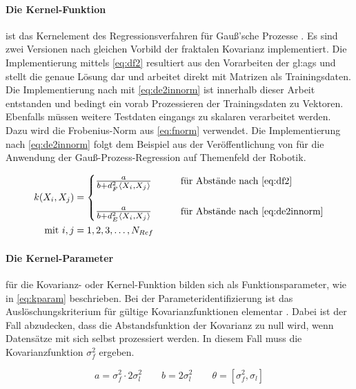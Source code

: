 \paragraph*{Die Kernel-Funktion} ist das Kernelement des Regressionsverfahren für Gauß'sche Prozesse \cite{Rasmussen2006}. Es sind zwei Versionen nach gleichen Vorbild der fraktalen Kovarianz \cite{Schuethe2020b}\cite{Schuethe2020}  implementiert. Die Implementierung mittels \autoref{eq:df2} resultiert aus den Vorarbeiten der \gls{gl:ags} und stellt die genaue Lösung dar und arbeitet direkt mit Matrizen als Trainingsdaten. Die Implementierung nach mit \autoref{eq:de2innorm} ist innerhalb dieser Arbeit entstanden und bedingt ein vorab Prozessieren der Trainingsdaten zu Vektoren. Ebenfalls müssen weitere Testdaten eingangs zu skalaren verarbeitet werden. Dazu wird die Frobenius-Norm aus \autoref{eq:fnorm} verwendet. Die Implementierung nach \autoref{eq:de2innorm} folgt dem Beispiel aus der Veröffentlichung von \citeauthor{Lang2014}\cite{Lang2014} für die Anwendung der Gauß-Prozess-Regression auf Themenfeld der Robotik.


\begin{align}\label{eq:kfun}
	k(X_i, X_j) &= 
		\begin{cases}
			\resizebox{.17\linewidth}{!}{$\frac{a}{b + d_F^2\langle X_i, X_j \rangle}$} &\qquad \text{für Abstände nach \autoref{eq:df2}} \\\\
			\resizebox{.17\linewidth}{!}{$\frac{a}{b + d_E^2\langle X_i, X_j \rangle}$} &\qquad \text{für Abstände nach \autoref{eq:de2innorm}}
		\end{cases} \\
\text{mit } i,j &= 1,2,3,\ldots,N_{Ref} \nonumber
\end{align}


\clearpage


\paragraph*{Die Kernel-Parameter} für die Kovarianz- oder Kernel-Funktion bilden sich als Funktionsparameter, wie in \autoref{eq:kparam} beschrieben. Bei der Parameteridentifizierung ist das Auslöschungskriterium für gültige Kovarianzfunktionen elementar \cite{Rasmussen2006}. Dabei ist der Fall abzudecken, dass die Abstandsfunktion der Kovarianz zu null wird, wenn Datensätze mit sich selbst prozessiert werden. In diesem Fall muss die Kovarianzfunktion $\sigma_f^2$ ergeben.


\begin{equation}\label{eq:kparam}
	a = \sigma_f^2 \cdot 2 \sigma_l^2 \qquad b = 2 \sigma_l^2 \qquad \theta = \left[\sigma_f^2, \sigma_l\right]
\end{equation}


